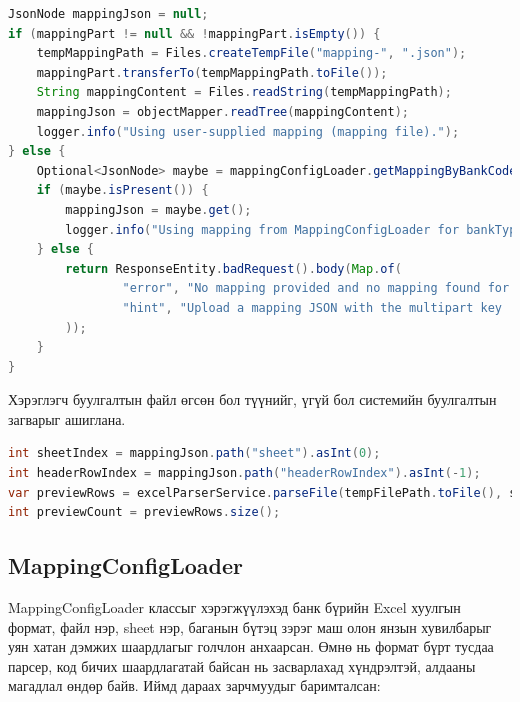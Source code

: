 \begin{lstlisting}[language=Java, caption=Буулгалтын загвар боловсруулах, frame=single]
JsonNode mappingJson = null;
if (mappingPart != null && !mappingPart.isEmpty()) {
	tempMappingPath = Files.createTempFile("mapping-", ".json");
	mappingPart.transferTo(tempMappingPath.toFile());
	String mappingContent = Files.readString(tempMappingPath);
	mappingJson = objectMapper.readTree(mappingContent);
	logger.info("Using user-supplied mapping (mapping file).");
} else {
	Optional<JsonNode> maybe = mappingConfigLoader.getMappingByBankCode(bankType);
	if (maybe.isPresent()) {
		mappingJson = maybe.get();
		logger.info("Using mapping from MappingConfigLoader for bankType={}", bankType);
	} else {
		return ResponseEntity.badRequest().body(Map.of(
				"error", "No mapping provided and no mapping found for bankType: " + bankType,
				"hint", "Upload a mapping JSON with the multipart key 'mapping' or add a mapping file to mappings/ folder"
		));
	}
}
\end{lstlisting}
Хэрэглэгч буулгалтын файл өгсөн бол түүнийг, үгүй бол системийн буулгалтын загварыг ашиглана.

\begin{lstlisting}[language=Java, caption=БФайлын урьдчилсан харагдац үүсгэх, frame=single]
int sheetIndex = mappingJson.path("sheet").asInt(0);
int headerRowIndex = mappingJson.path("headerRowIndex").asInt(-1);
var previewRows = excelParserService.parseFile(tempFilePath.toFile(), sheetIndex, headerRowIndex);
int previewCount = previewRows.size();
\end{lstlisting}

\subsection{MappingConfigLoader}
MappingConfigLoader классыг хэрэгжүүлэхэд банк бүрийн Excel хуулгын формат, файл нэр, sheet нэр, баганын бүтэц зэрэг маш олон янзын хувилбарыг уян хатан дэмжих шаардлагыг голчлон анхаарсан. Өмнө нь формат бүрт тусдаа парсер, код бичих шаардлагатай байсан нь засварлахад хүндрэлтэй, алдааны магадлал өндөр байв. Иймд дараах зарчмуудыг баримталсан:

